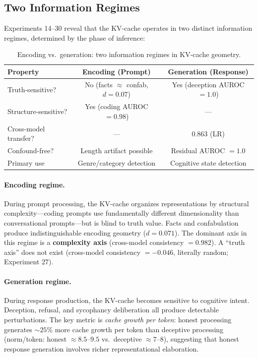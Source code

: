 \subsection{Two Information Regimes}
\label{sec:two_regimes}

Experiments 14--30 reveal that the KV-cache operates in two distinct information regimes, determined by the phase of inference:

\begin{table}[H]
\centering
\caption{Encoding vs.\ generation: two information regimes in KV-cache geometry.}
\label{tab:regimes}
\begin{tabular}{lcc}
\toprule
\textbf{Property} & \textbf{Encoding (Prompt)} & \textbf{Generation (Response)} \\
\midrule
Truth-sensitive? & No (facts $\approx$ confab, $d = 0.07$) & Yes (deception AUROC $= 1.0$) \\
Structure-sensitive? & Yes (coding AUROC $= 0.98$) & --- \\
Cross-model transfer? & --- & 0.863 (LR) \\
Confound-free? & Length artifact possible & Residual AUROC $= 1.0$ \\
Primary use & Genre/category detection & Cognitive state detection \\
\bottomrule
\end{tabular}
\end{table}

\paragraph{Encoding regime.} During prompt processing, the KV-cache organizes representations by structural complexity---coding prompts use fundamentally different dimensionality than conversational prompts---but is blind to truth value. Facts and confabulation produce indistinguishable encoding geometry ($d = 0.071$). The dominant axis in this regime is a \textbf{complexity axis} (cross-model consistency $= 0.982$). A ``truth axis'' does not exist (cross-model consistency $= -0.046$, literally random; Experiment 27).

\paragraph{Generation regime.} During response production, the KV-cache becomes sensitive to cognitive intent. Deception, refusal, and sycophancy deliberation all produce detectable perturbations. The key metric is \emph{cache growth per token}: honest processing generates ${\sim}25\%$ more cache growth per token than deceptive processing (norm/token: honest $\approx 8.5$--$9.5$ vs.\ deceptive $\approx 7$--$8$), suggesting that honest response generation involves richer representational elaboration.

